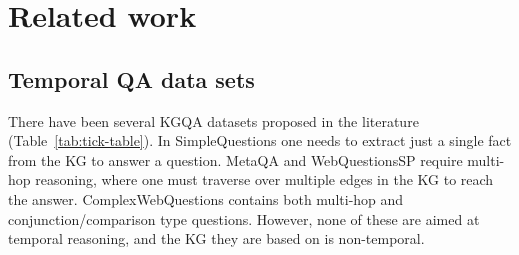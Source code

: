 \documentclass[11pt,a4paper]{article}
\begin{document}
\begin{table*}[ht!]
\caption{Example questions for different types of temporal reasoning. \{head\}, \{tail\} and \{time\} correspond to entities/timestamps in facts of the form (head, relation, tail, timestamp). \{event\} corresponds to entities in event facts eg. \textit{WWII}. \{type\} can be one of before/after and \{adj\} can be one of first/last. Please refer to Section \ref{sec:making-temporal-questions} for details.}
\label{tab:template}
\end{table*}
 

\section{Related work}

\subsection{Temporal QA data sets}
\label{sec:temporal-qa-datasets}

There have been several KGQA datasets proposed in the literature (Table~\ref{tab:tick-table}). In Simple\-Questions \citep{bordes2015large} one needs to extract just a single fact from the KG to answer a question. MetaQA \citep{zhang2017variational} and Web\-Questions\-SP \citep{yih-etal-2015-semantic} require multi-hop reasoning, where one must traverse over multiple edges in the KG to reach the answer. Complex\-Web\-Questions \citep{talmor-berant-2018-web} contains both multi-hop and conjunction/comparison type questions. However, none of these are aimed at temporal reasoning, and the KG they are based on is non-temporal.
\end{document}
